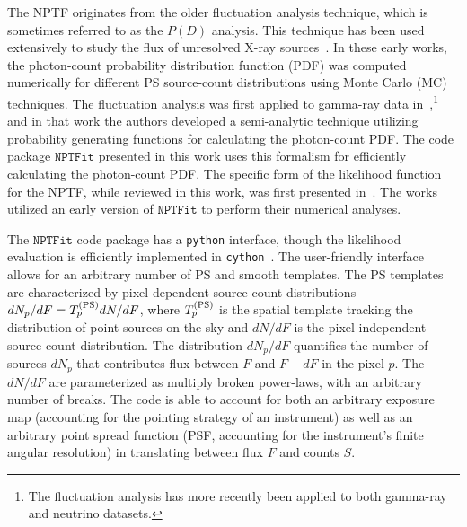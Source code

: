 The NPTF originates from the older fluctuation analysis technique, which is sometimes referred to as the $P(D)$ analysis.  This technique has been used extensively to study the flux of unresolved X-ray sources~\cite{hasinger1993,1993MNRAS.262..619G,Gendreau:1997di,Perri:2000fv,Miyaji:2001dp}.  In these early works, the photon-count probability distribution function (PDF) was computed numerically for different PS source-count distributions using Monte Carlo (MC) techniques.  The fluctuation analysis was first applied to gamma-ray data in~\cite{Malyshev:2011zi},\footnote{The fluctuation analysis has more recently been applied to both gamma-ray \cite{Feyereisen:2015cea} and neutrino \cite{Feyereisen:2016fzb} datasets.} and in that work the authors developed a semi-analytic technique utilizing probability generating functions for calculating the photon-count PDF.  The code package $\texttt{NPTFit}$ presented in this work uses this formalism for efficiently calculating the photon-count PDF.  The specific form of the likelihood function for the NPTF, while reviewed in this work, was first presented in~\cite{Lee:2015fea}.  The works~\cite{Lee:2015fea,Linden:2016rcf,Lisanti:2016jub} utilized an early version of $\texttt{NPTFit}$ to perform their numerical analyses. 

The $\texttt{NPTFit}$ code package has a \texttt{python} interface, though the likelihood evaluation is efficiently implemented in \texttt{cython}~\cite{behnel2010cython}.  The user-friendly interface allows for an arbitrary number of PS and smooth templates.  The PS templates are characterized by pixel-dependent source-count distributions $dN_p/dF = T_p^{({\rm PS})} dN/dF$, where $T_p^{({\rm PS})}$ is the spatial template tracking the distribution of point sources on the sky and $dN/dF$ is the pixel-independent source-count distribution.  The distribution $dN_p/dF$ quantifies the number of sources $dN_p$ that contributes flux between $F$ and $F + dF$ in the pixel $p$.  The $dN/dF$ are parameterized as multiply broken power-laws, with an arbitrary number of breaks.  The code is able to account for both an arbitrary exposure map (accounting for the pointing strategy of an instrument) as well as an arbitrary point spread function (PSF, accounting for the instrument's finite angular resolution) in translating between flux $F$ and counts $S$. 

